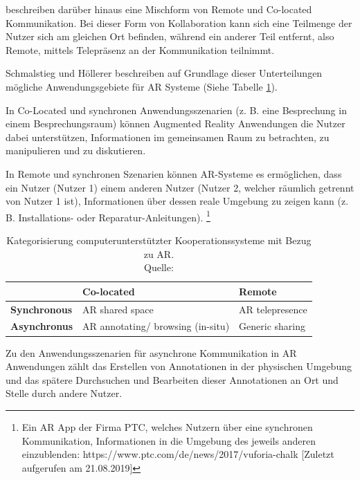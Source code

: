 \cite[S.~188]{ElSayedNevenA.M.BruceH.ThomasRossT.Smith2015} beschreiben darüber hinaus eine Mischform von Remote und Co-located Kommunikation. 
Bei dieser Form von Kollaboration kann sich eine Teilmenge der Nutzer sich am gleichen Ort befinden, während ein anderer Teil entfernt, 
also Remote, mittels Telepräsenz an der Kommunikation teilnimmt. 

Schmalstieg und Höllerer \cite[S.~362]{DieterSchmalstieg2016} beschreiben auf Grundlage dieser Unterteilungen mögliche 
Anwendungsgebiete für AR Systeme (Siehe Tabelle \ref{tab:categorycscw}).

\cite[S.~362]{DieterSchmalstieg2016} In Co-Located und synchronen Anwendungsszenarien (z. B. eine Besprechung in einem Besprechungsraum) können 
Augmented Reality Anwendungen die Nutzer dabei unterstützen, Informationen im gemeinsamen Raum zu betrachten, zu manipulieren und zu diskutieren. 

In Remote und synchronen Szenarien können AR-Systeme es ermöglichen, dass ein Nutzer (Nutzer 1) einem anderen Nutzer (Nutzer 2, welcher räumlich getrennt von Nutzer 1 ist), 
Informationen über dessen reale Umgebung zu zeigen kann (z. B. Installations- oder Reparatur-Anleitungen). \footnote{Ein AR App der Firma PTC, welches Nutzern über eine synchronen Kommunikation, Informationen in die Umgebung des jeweils anderen einzublenden: https://www.ptc.com/de/news/2017/vuforia-chalk [Zuletzt aufgerufen am 21.08.2019]} 

\begin{table}[htbp]
\caption{Kategorisierung computerunterstützter Kooperationssysteme mit Bezug zu AR. \\Quelle: \cite[S.~362]{DieterSchmalstieg2016}}
	\begin{center}
		\begin{tabular}{|l|ll|}
		\hline
		 & \textbf{Co-located} & \textbf{Remote}\\
		\hline
		\textbf{Synchronous} &  AR shared space & AR telepresence \\
		\textbf{Asynchronus} & AR annotating/ browsing (in-situ) & Generic sharing\\
		\hline
		\end{tabular}
	\end{center}
	\label{tab:categorycscw}
\end{table}

\cite[S.~362]{DieterSchmalstieg2016} Zu den Anwendungsszenarien für asynchrone Kommunikation in AR Anwendungen zählt das Erstellen von Annotationen in der 
physischen Umgebung und das spätere Durchsuchen und Bearbeiten dieser Annotationen an Ort und Stelle durch andere Nutzer.		

